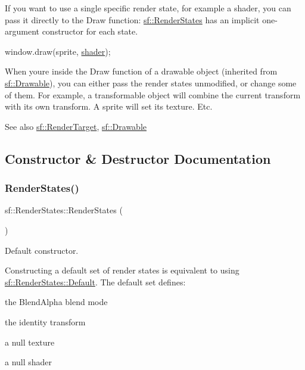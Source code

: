 If you want to use a single specific render state, for example a shader, you can pass it directly to the Draw function\+: \hyperlink{classsf_1_1_render_states}{sf\+::\+Render\+States} has an implicit one-\/argument constructor for each state. 
\begin{DoxyCode}
window.draw(sprite, \hyperlink{classsf_1_1_render_states_ad4f79ecdd0c60ed0d24fbe555b221bd8}{shader});
\end{DoxyCode}


When you\textquotesingle{}re inside the Draw function of a drawable object (inherited from \hyperlink{classsf_1_1_drawable}{sf\+::\+Drawable}), you can either pass the render states unmodified, or change some of them. For example, a transformable object will combine the current transform with its own transform. A sprite will set its texture. Etc.

\begin{DoxySeeAlso}{See also}
\hyperlink{classsf_1_1_render_target}{sf\+::\+Render\+Target}, \hyperlink{classsf_1_1_drawable}{sf\+::\+Drawable} 
\end{DoxySeeAlso}


\subsection{Constructor \& Destructor Documentation}
\mbox{\label{classsf_1_1_render_states_a885bf14070d0d5391f062f62b270b7d0}} 
\subsubsection{\texorpdfstring{Render\+States()}{RenderStates()}\hspace{0.1cm}{\footnotesize\ttfamily [1/6]}}
{\footnotesize\ttfamily sf\+::\+Render\+States\+::\+Render\+States (\begin{DoxyParamCaption}{ }\end{DoxyParamCaption})}



Default constructor. 

Constructing a default set of render states is equivalent to using \hyperlink{classsf_1_1_render_states_ad29672df29f19ce50c3021d95f2bb062}{sf\+::\+Render\+States\+::\+Default}. The default set defines\+: \begin{DoxyItemize}
\item the Blend\+Alpha blend mode \item the identity transform \item a null texture \item a null shader \end{DoxyItemize}
\mbox{\label{classsf_1_1_render_states_acac8830a593c8a4523ac2fdf3cac8a01}} 
